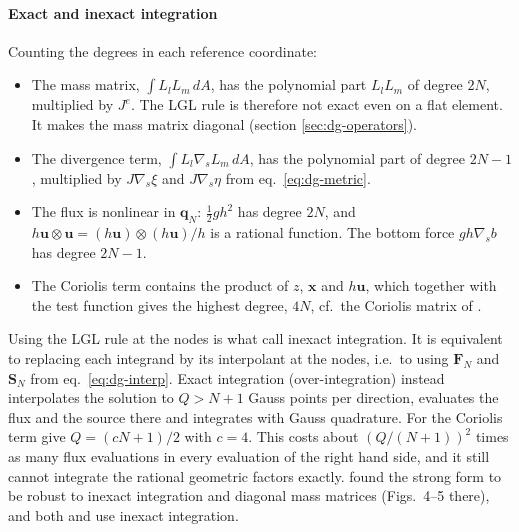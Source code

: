 \paragraph{Exact and inexact integration}
Counting the degrees in each reference coordinate:
\begin{itemize}
    \item The mass matrix, $\int L_lL_m\,dA$, has the polynomial part $L_lL_m$ of degree $2N$, multiplied by $J^e$. The LGL rule is therefore not exact even on a flat element. It makes the mass matrix diagonal (section \ref{sec:dg-operators}).
    \item The divergence term, $\int L_l\nabla_s L_m\,dA$, has the polynomial part of degree $2N-1$, multiplied by $J\nabla_s\xi$ and $J\nabla_s\eta$ from eq.~\eqref{eq:dg-metric}.
    \item The flux is nonlinear in $\mathbf{q}_N$: $\frac12gh^2$ has degree $2N$, and $h\mathbf{u}\otimes\mathbf{u} = (h\mathbf{u})\otimes(h\mathbf{u})/h$ is a rational function. The bottom force $gh\nabla_s b$ has degree $2N-1$.
    \item The Coriolis term contains the product of $z$, $\mathbf{x}$ and $h\mathbf{u}$, which together with the test function gives the highest degree, $4N$, cf.\ the Coriolis matrix of \cite{GIRALDO2002499}.
\end{itemize}
Using the LGL rule at the nodes is what \cite{GIRALDO2002499} call inexact integration. It is equivalent to replacing each integrand by its interpolant at the nodes, i.e.\ to using $\mathbf{F}_N$ and $\mathbf{S}_N$ from eq.~\eqref{eq:dg-interp}. Exact integration (over-integration) instead interpolates the solution to $Q > N+1$ Gauss points per direction, evaluates the flux and the source there and integrates with Gauss quadrature. For the Coriolis term \cite{GIRALDO2002499} give $Q = (cN+1)/2$ with $c = 4$. This costs about $(Q/(N+1))^2$ times as many flux evaluations in every evaluation of the right hand side, and it still cannot integrate the rational geometric factors exactly. \cite{GIRALDO2002499} found the strong form to be robust to inexact integration and diagonal mass matrices (Figs.~4--5 there), and both \cite{GIRALDO2002499} and \cite{bonev2018discontinuous} use inexact integration.



